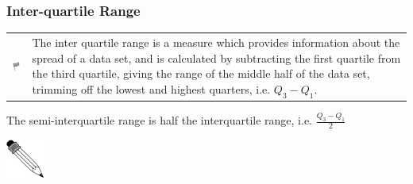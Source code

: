 \begin{description}[noitemsep]
\begin{description}[noitemsep]
            \subsubsection{ Inter-quartile Range}
            \nopagebreak
\par
            \label{m39400*fhsst!!!underscore!!!id1859}\begin{definition}
	  \begin{tabular*}{15 cm}{m{15 mm}m{}}
	\hspace*{-50pt}  \includegraphics[width=0.5in]{col11306.imgs/psflag2.png}   & \Definition{   \label{id2623786}\textbf{ Inter-quartile Range }} { \label{m39400*meaningfhsst!!!underscore!!!id1859}
          \label{m39400*id214019}The inter quartile range is a measure which provides information about the spread of a data set, and is calculated by subtracting the first quartile from the third quartile, giving the range of the middle half of the data set, trimming off the lowest and highest quarters, i.e. ${Q}_{3}-{Q}_{1}$. \par 
           } 
      \end{tabular*}
      \end{definition}
          \label{m39400*id214058}The semi-interquartile range is half the interquartile range, i.e. $\frac{{Q}_{3}-{Q}_{1}}{2}$\par 
\par
            \label{m39400*secfhsst!!!underscore!!!id1863}\vspace{.5cm} 
      \noindent
      \hspace*{-30pt}\includegraphics[width=0.5in]{col11306.imgs/pspencil2.png}   
\end{description}
\end{description}
